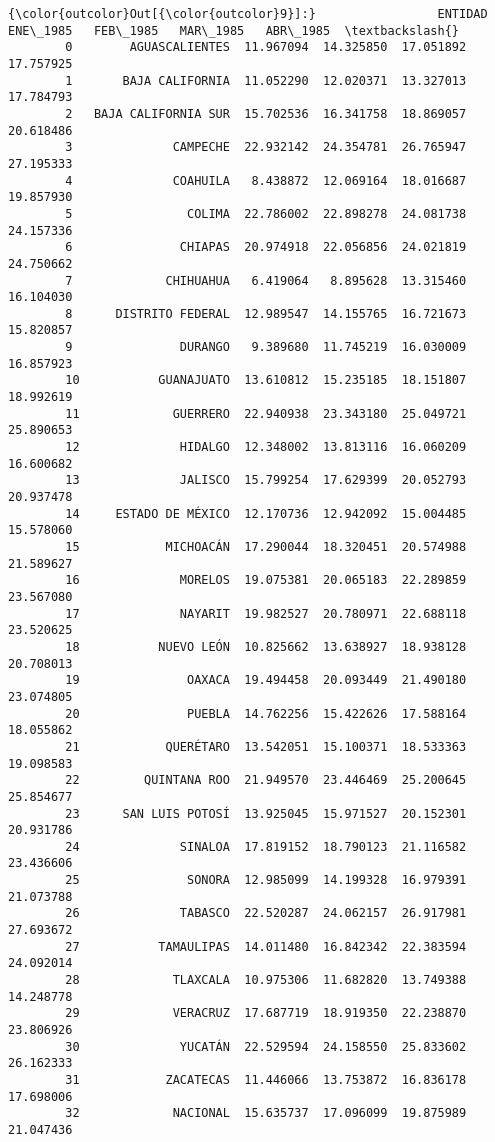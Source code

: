 \documentclass[11pt]{article}
\begin{document}
\begin{Verbatim}[commandchars=\\\{\}]
{\color{outcolor}Out[{\color{outcolor}9}]:}                 ENTIDAD   ENE\_1985   FEB\_1985   MAR\_1985   ABR\_1985  \textbackslash{}
        0        AGUASCALIENTES  11.967094  14.325850  17.051892  17.757925   
        1       BAJA CALIFORNIA  11.052290  12.020371  13.327013  17.784793   
        2   BAJA CALIFORNIA SUR  15.702536  16.341758  18.869057  20.618486   
        3              CAMPECHE  22.932142  24.354781  26.765947  27.195333   
        4              COAHUILA   8.438872  12.069164  18.016687  19.857930   
        5                COLIMA  22.786002  22.898278  24.081738  24.157336   
        6               CHIAPAS  20.974918  22.056856  24.021819  24.750662   
        7             CHIHUAHUA   6.419064   8.895628  13.315460  16.104030   
        8      DISTRITO FEDERAL  12.989547  14.155765  16.721673  15.820857   
        9               DURANGO   9.389680  11.745219  16.030009  16.857923   
        10           GUANAJUATO  13.610812  15.235185  18.151807  18.992619   
        11             GUERRERO  22.940938  23.343180  25.049721  25.890653   
        12              HIDALGO  12.348002  13.813116  16.060209  16.600682   
        13              JALISCO  15.799254  17.629399  20.052793  20.937478   
        14     ESTADO DE MÉXICO  12.170736  12.942092  15.004485  15.578060   
        15            MICHOACÁN  17.290044  18.320451  20.574988  21.589627   
        16              MORELOS  19.075381  20.065183  22.289859  23.567080   
        17              NAYARIT  19.982527  20.780971  22.688118  23.520625   
        18           NUEVO LEÓN  10.825662  13.638927  18.938128  20.708013   
        19               OAXACA  19.494458  20.093449  21.490180  23.074805   
        20               PUEBLA  14.762256  15.422626  17.588164  18.055862   
        21            QUERÉTARO  13.542051  15.100371  18.533363  19.098583   
        22         QUINTANA ROO  21.949570  23.446469  25.200645  25.854677   
        23      SAN LUIS POTOSÍ  13.925045  15.971527  20.152301  20.931786   
        24              SINALOA  17.819152  18.790123  21.116582  23.436606   
        25               SONORA  12.985099  14.199328  16.979391  21.073788   
        26              TABASCO  22.520287  24.062157  26.917981  27.693672   
        27           TAMAULIPAS  14.011480  16.842342  22.383594  24.092014   
        28             TLAXCALA  10.975306  11.682820  13.749388  14.248778   
        29             VERACRUZ  17.687719  18.919350  22.238870  23.806926   
        30              YUCATÁN  22.529594  24.158550  25.833602  26.162333   
        31            ZACATECAS  11.446066  13.753872  16.836178  17.698006   
        32             NACIONAL  15.635737  17.096099  19.875989  21.047436   
        

\end{Verbatim}
\end{document}
